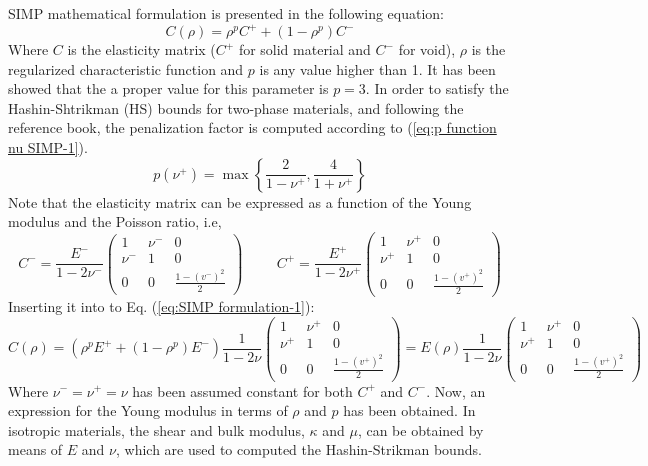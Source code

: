 SIMP mathematical formulation is presented in the following equation:
\begin{equation}
C(\rho)=\rho^{p}C^{+}+(1-\rho^{p})C^{-}\label{eq:SIMP formulation-1}
\end{equation}
Where $C$ is the elasticity matrix ($C^{+}$ for solid material and
$C^{-}$ for void), $\rho$ is the regularized characteristic function and $p$ is any value higher
than 1. It has been showed that the a proper value for this parameter is $ p=3 $. In order to satisfy the Hashin-Shtrikman (HS) bounds for two-phase
materials, and following the reference book, the penalization factor is computed according to (\ref{eq:p function nu SIMP-1}).
\begin{equation}
p(\nu^{+})=\max\left\{ \frac{2}{1-\nu^{+}},\frac{4}{1+\nu^{+}}\right\} \label{eq:p function nu SIMP-1}
\end{equation}
Note that the elasticity matrix can be expressed as a function of the Young modulus and the Poisson ratio, i.e,
\begin{equation}
C^-=\frac{E^-}{1-2\nu^-}\left(\begin{matrix} 
1 & \nu^- & 0 \\
\nu^- & 1 & 0 \\
0 & 0 & \frac{1-(v^-)^2}{2} 
\end{matrix}\right)
\hspace{1cm}
C^+=\frac{E^+}{1-2\nu^+}\left(\begin{matrix} 
1 & \nu^+ & 0 \\
\nu^+ & 1 & 0 \\
0 & 0 & \frac{1-(v^+)^2}{2} 
\end{matrix}\right)
\end{equation}
Inserting it into to Eq. (\ref{eq:SIMP formulation-1}):
\begin{equation}
	C(\rho)=(\rho^pE^++(1-\rho^p)E^-)\frac{1}{1-2\nu}\left(\begin{matrix}
		1     & \nu^+ & 0                   \\
		\nu^+ & 1     & 0                   \\
		0     & 0     & \frac{1-(v^+)^2}{2}
	\end{matrix}\right)=E(\rho)\frac{1}{1-2\nu}\left(\begin{matrix} 
	1 & \nu^+ & 0 \\
	\nu^+ & 1 & 0 \\
	0 & 0 & \frac{1-(v^+)^2}{2} 
	\end{matrix}\right)
\end{equation}
Where $ \nu^-=\nu^+=\nu $ has been assumed constant for both $ C^+ $ and $ C^- $. Now, an expression for the Young modulus in terms of $\rho$ and $p$ has been obtained. In isotropic materials, the shear and bulk modulus, $ \kappa $ and $ \mu $, can be obtained by means of $ E $ and $ \nu $, which are used to computed the Hashin-Strikman bounds.

